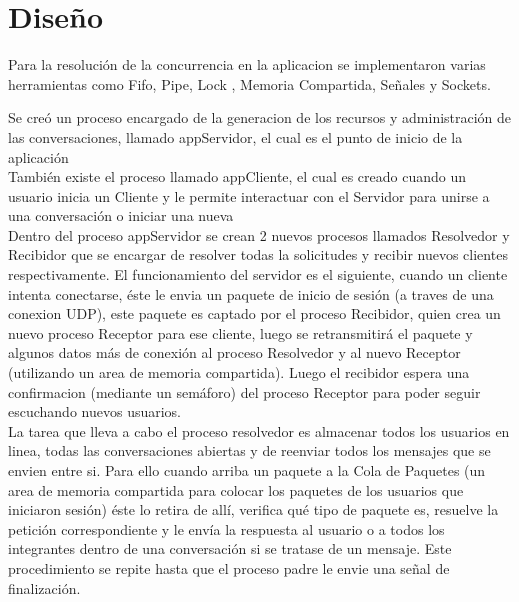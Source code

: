 \documentclass[a4paper,12pt,titlepage]{article}
\begin{document}
\newpage
\section{Diseño}

Para la resolución de la concurrencia en la aplicacion se implementaron varias herramientas como Fifo, Pipe, Lock , 
Memoria Compartida, Señales y Sockets.

Se creó un proceso encargado de la generacion de los recursos y administración de las conversaciones, llamado 
appServidor, el cual es el punto de inicio de la aplicación\\

También existe el proceso llamado appCliente, el cual es creado cuando un usuario inicia un Cliente y le permite interactuar con
el Servidor para unirse a una conversación o iniciar una nueva\\

Dentro del proceso appServidor se crean 2 nuevos procesos llamados Resolvedor y Recibidor que se encargar de resolver todas la solicitudes 
y recibir nuevos clientes respectivamente.
El funcionamiento del servidor es el siguiente, cuando un cliente intenta conectarse, éste le envia un paquete de inicio de sesión (a traves 
de una conexion UDP), este paquete es captado por el proceso Recibidor, quien crea un nuevo proceso Receptor para ese cliente, luego 
se retransmitirá el paquete y algunos datos más de conexión al proceso Resolvedor y al nuevo Receptor (utilizando un area de memoria compartida). 
Luego el recibidor espera una confirmacion (mediante un semáforo) del proceso Receptor para poder seguir escuchando nuevos usuarios.\\

La tarea que lleva a cabo el proceso resolvedor es almacenar todos los usuarios en linea, todas las conversaciones abiertas y de reenviar 
todos los mensajes que se envien entre si. Para ello cuando arriba un paquete a la Cola de Paquetes (un area de memoria compartida para colocar 
los paquetes de los usuarios que iniciaron sesión) éste lo retira de allí, verifica qué tipo de paquete es, resuelve la petición correspondiente y 
le envía la respuesta al usuario o a todos los integrantes dentro de una conversación si se tratase de un mensaje. Este procedimiento se repite 
hasta que el proceso padre le envie una señal de finalización.\\
\end{document}

